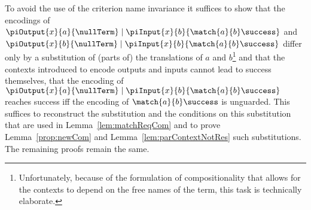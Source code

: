 \documentclass[]{article}
\begin{document}
To avoid the use of the criterion name invariance it suffices to show that the encodings of $ \piOutput{x}{a}{\nullTerm} \mid \piInput{x}{b}{\match{a}{b}\success} $ and $ \piOutput{x}{b}{\nullTerm} \mid \piInput{x}{b}{\match{a}{b}\success} $ differ only by a substitution of (parts of) the translations of $ a $ and $ b $\footnote{Unfortunately, because of the formulation of compositionality that allows for the contexts to depend on the free names of the term, this task is technically elaborate.} and that the contexts introduced to encode outputs and inputs cannot lead to success themselves, \ie that the encoding of $ \piOutput{x}{a}{\nullTerm} \mid \piInput{x}{b}{\match{a}{b}\success} $ reaches success iff the encoding of $ \match{a}{b}\success $ is unguarded. This suffices to reconstruct the substitution and the conditions on this substitution that are used in Lemma~\ref{lem:matchReqCom} and to prove Lemma~\ref{prop:newCom} and Lemma~\ref{lem:parContextNotRes} \wrt such substitutions. The remaining proofs remain the same.
\end{document}
